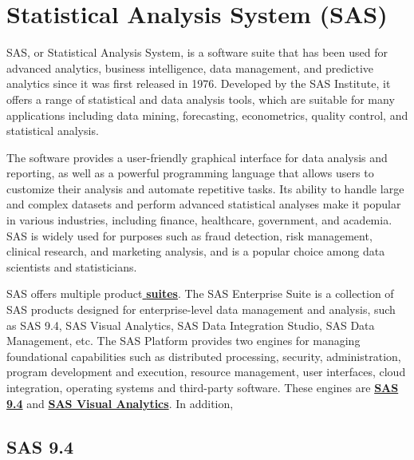 \section{Statistical Analysis System (SAS)} \label{section: SAS}
SAS, or Statistical Analysis System, is a software suite that has been used for advanced analytics, business intelligence, data management, and predictive analytics since it was first released in 1976. Developed by the SAS Institute, it offers a range of statistical and data analysis tools, which are suitable for many applications including data mining, forecasting, econometrics, quality control, and statistical analysis.

The software provides a user-friendly graphical interface for data analysis and reporting, as well as a powerful programming language that allows users to customize their analysis and automate repetitive tasks. Its ability to handle large and complex datasets and perform advanced statistical analyses make it popular in various industries, including finance, healthcare, government, and academia. SAS is widely used for purposes such as fraud detection, risk management, clinical research, and marketing analysis, and is a popular choice among data scientists and statisticians. 

SAS offers multiple product\href{https://www.sas.com/en_us/software/all-products.html#all-products-a-z}{\textbf{ suites}}. The SAS Enterprise Suite is a collection of SAS products designed for enterprise-level data management and analysis, such as SAS 9.4, SAS Visual Analytics, SAS Data Integration Studio, SAS Data Management, etc. The SAS Platform provides two engines for managing foundational capabilities such as distributed processing, security, administration, program development and execution, resource management, user interfaces, cloud integration, operating systems and third-party software. These engines are \href{https://documentation.sas.com/doc/en/pgmsascdc/9.4_3.5/whatsnew/n17cszme3e52b4n1ooe3710fnuec.htm#:~:text=Initial%20Release%20of%20SAS%209.4,-The%20initial%20release&text=For%20SAS%20administrators%2C%20SAS%209.4,more%20complete%20data%20management%20solution.}{\textbf{SAS 9.4}} and \href{https://documentation.sas.com/doc/en/pgmsascdc/9.4_3.5/pgmsasgswlcm/home.htm}{\textbf{SAS Visual Analytics}}. In addition, 

\subsection{SAS 9.4}
\textcolor{red}{\lipsum[1-3]}

